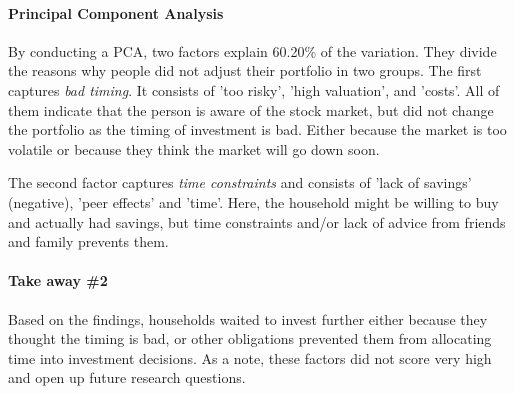 \documentclass[ProjectABM]{subfiles}
\begin{document}



\paragraph{Principal Component Analysis}
By conducting a PCA, two factors explain 60.20\% of the variation. They divide the reasons why people did not adjust their portfolio in two groups. The first captures \textit{bad timing}. It consists of 'too risky', 'high valuation', and 'costs'. All of them indicate that the person is aware of the stock market, but did not change the portfolio as the timing of investment is bad. Either because the market is too volatile or because they think the market will go down soon.

The second factor captures \textit{time constraints} and consists of 'lack of savings' (negative), 'peer effects' and 'time'. Here, the household might be willing to buy and actually had savings, but time constraints and/or lack of advice from friends and family prevents them.




\paragraph{Take away \#2}
Based on the findings, households waited to invest further either because they thought the timing is bad, or other obligations prevented them from allocating time into investment decisions. As a note, these factors did not score very high and open up future research questions.
\end{document}
